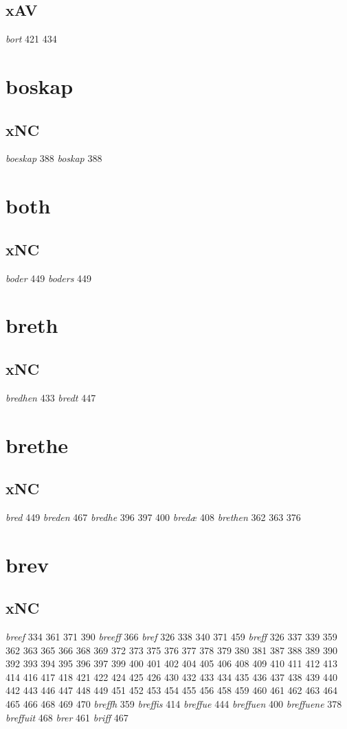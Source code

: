 \documentclass[a4paper,twocolumn]{article}
\begin{document}
\subsection{xAV}
\label{sec:org71c03d6}
\emph{bort} 421 434 
\section{boskap}
\label{sec:org2951bc5}
\subsection{xNC}
\label{sec:org561c990}
\emph{boeskap} 388 \emph{boskap} 388 
\section{both}
\label{sec:orgdcea11f}
\subsection{xNC}
\label{sec:org3789e95}
\emph{boder} 449 \emph{boders} 449 
\section{breth}
\label{sec:org991b00f}
\subsection{xNC}
\label{sec:orge83a1a7}
\emph{bredhen} 433 \emph{bredt} 447 
\section{brethe}
\label{sec:org97165bd}
\subsection{xNC}
\label{sec:org57b746b}
\emph{bred} 449 \emph{breden} 467 \emph{bredhe} 396 397 400 \emph{bredæ} 408 \emph{brethen} 362 363 376 
\section{brev}
\label{sec:org01a7a42}
\subsection{xNC}
\label{sec:orgf0d0cf3}
\emph{breef} 334 361 371 390 \emph{breeff} 366 \emph{bref} 326 338 340 371 459 \emph{breff} 326 337 339 359 362 363 365 366 368 369 372 373 375 376 377 378 379 380 381 387 388 389 390 392 393 394 395 396 397 399 400 401 402 404 405 406 408 409 410 411 412 413 414 416 417 418 421 422 424 425 426 430 432 433 434 435 436 437 438 439 440 442 443 446 447 448 449 451 452 453 454 455 456 458 459 460 461 462 463 464 465 466 468 469 470 \emph{breffh} 359 \emph{breffis} 414 \emph{breffue} 444 \emph{breffuen} 400 \emph{breffuene} 378 \emph{breffuit} 468 \emph{brer} 461 \emph{briff} 467 
\end{document}
